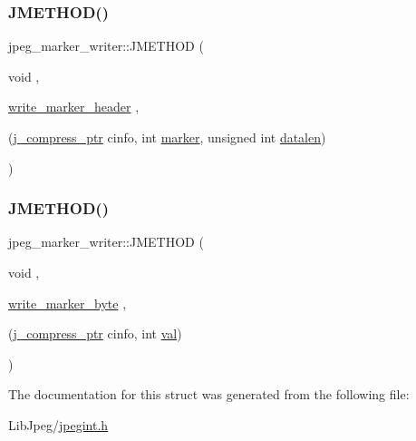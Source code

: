 \subsubsection{\texorpdfstring{JMETHOD()}{JMETHOD()}\hspace{0.1cm}{\footnotesize\ttfamily [6/7]}}
{\footnotesize\ttfamily jpeg\+\_\+marker\+\_\+writer\+::\+J\+M\+E\+T\+H\+OD (\begin{DoxyParamCaption}\item[{void}]{,  }\item[{\mbox{\hyperlink{jcmarker_8c_a8c03fbb86d90f4dddf41d4d7002ec881}{write\+\_\+marker\+\_\+header}}}]{,  }\item[{(\mbox{\hyperlink{jpeglib_8h_add2a072c54e3a51550f4975f7ddb91e7}{j\+\_\+compress\+\_\+ptr}} cinfo, int \mbox{\hyperlink{jpeglib_8h_a55fc502015142062735ebfd18c825354}{marker}}, unsigned int \mbox{\hyperlink{jpeglib_8h_a37893c863bbe3ef78feca71570de3017}{datalen}})}]{ }\end{DoxyParamCaption})}

\mbox{\label{structjpeg__marker__writer_a193395c80dab66a95681aff53cd5c468}} 
\subsubsection{\texorpdfstring{JMETHOD()}{JMETHOD()}\hspace{0.1cm}{\footnotesize\ttfamily [7/7]}}
{\footnotesize\ttfamily jpeg\+\_\+marker\+\_\+writer\+::\+J\+M\+E\+T\+H\+OD (\begin{DoxyParamCaption}\item[{void}]{,  }\item[{\mbox{\hyperlink{jcmarker_8c_a6cbd2d536978f7c91a0ff7f2580e1a52}{write\+\_\+marker\+\_\+byte}}}]{,  }\item[{(\mbox{\hyperlink{jpeglib_8h_add2a072c54e3a51550f4975f7ddb91e7}{j\+\_\+compress\+\_\+ptr}} cinfo, int \mbox{\hyperlink{jpeglib_8h_aa0ccb5ee6d882ee3605ff47745c6467b}{val}})}]{ }\end{DoxyParamCaption})}



The documentation for this struct was generated from the following file\+:\begin{DoxyCompactItemize}
\item 
Lib\+Jpeg/\mbox{\hyperlink{jpegint_8h}{jpegint.\+h}}\end{DoxyCompactItemize}
